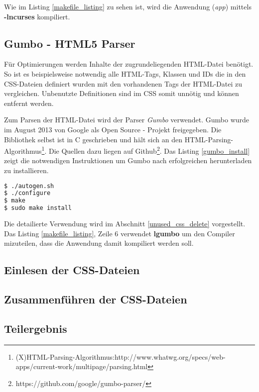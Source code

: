 Wie im Listing \ref{makefile_listing} zu sehen ist, wird die Anwendung (\textit{app}) mittels \textbf{-lncurses} kompiliert. 

\subsection{Gumbo - HTML5 Parser}
Für Optimierungen werden Inhalte der zugrundeliegenden HTML-Datei benötigt. So ist es beispielsweise notwendig alle HTML-Tags, Klassen und IDs die in den CSS-Dateien definiert wurden mit den vorhandenen Tags der HTML-Datei zu vergleichen. Unbenutzte Definitionen sind im CSS somit unnötig und können entfernt werden.

Zum Parsen der HTML-Datei wird der Parser \textit{Gumbo} verwendet. Gumbo wurde im August 2013 von Google als Open Source - Projekt freigegeben. Die Bibliothek selbst ist in C geschrieben und hält sich an den HTML-Parsing-Algorithmus\footnote{(X)HTML-Parsing-Algorithmus:http://www.whatwg.org/specs/web-apps/current-work/multipage/parsing.html}. Die Quellen dazu liegen auf Github\footnote{https://github.com/google/gumbo-parser/}. Das Listing \ref{gumbo_install} zeigt die notwendigen Instruktionen um Gumbo nach erfolgreichen herunterladen zu installieren.

\begin{lstlisting}[label=gumbo_install,language=bash, caption=Installation der gumbo Bibliothek]
$ ./autogen.sh
$ ./configure
$ make
$ sudo make install
\end{lstlisting}

Die detailierte Verwendung wird im Abschnitt \ref{unused_css_delete} vorgestellt. Das Listing \ref{makefile_listing}, Zeile 6 verwendet \textbf{lgumbo} um den Compiler mizuteilen, dass die Anwendung damit kompiliert werden soll. 

\subsection{Einlesen der CSS-Dateien}
\subsection{Zusammenführen der CSS-Dateien}
\subsection{Teilergebnis}
